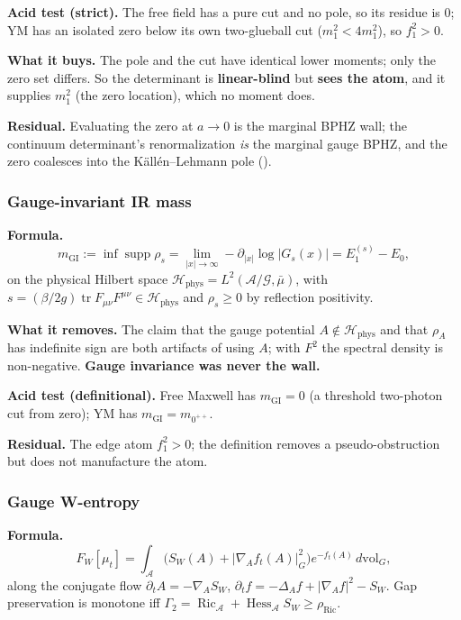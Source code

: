 \textbf{Acid test (strict).} The free field has a pure cut and no pole, so its residue is $0$;
YM has an isolated zero below its own two-glueball cut ($m_1^2<4m_1^2$), so $f_1^2>0$.

\textbf{What it buys.} The pole and the cut have identical lower moments; only the zero set
differs. So the determinant is \textbf{linear-blind} but \textbf{sees the atom}, and it supplies
$m_1^2$ (the zero location), which no moment does.

\textbf{Residual.} Evaluating the zero at $a\to0$ is the marginal BPHZ wall; the continuum
determinant's renormalization \emph{is} the marginal gauge BPHZ, and the zero coalesces into the
K\"all\'en--Lehmann pole ().

\subsubsection{Gauge-invariant IR mass}

\textbf{Formula.}
\begin{equation}
m_{\mathrm{GI}}:=\inf\operatorname{supp}\rho_s
=\lim_{|x|\to\infty}-\partial_{|x|}\log|G_s(x)|=E_1^{(s)}-E_0 ,
\label{eq:mgi}
\end{equation}
on the physical Hilbert space
$\mathcal{H}_{\mathrm{phys}}=L^2(\mathcal{A}/\mathcal{G},\bar\mu)$, with
$s=(\beta/2g)\operatorname{tr}F_{\mu\nu}F^{\mu\nu}\in \mathcal{H}_{\mathrm{phys}}$ and
$\rho_s\ge0$ by reflection positivity.

\textbf{What it removes.} The claim that the gauge potential $A\notin \mathcal{H}_{\mathrm{phys}}$
and that $\rho_A$ has indefinite sign are both artifacts of using $A$; with $F^2$ the spectral
density is non-negative. \textbf{Gauge invariance was never the wall.}

\textbf{Acid test (definitional).} Free Maxwell has $m_{\mathrm{GI}}=0$ (a threshold two-photon
cut from zero); YM has $m_{\mathrm{GI}}=m_{0^{++}}$.

\textbf{Residual.} The edge atom $f_1^2>0$; the definition removes a pseudo-obstruction but does
not manufacture the atom.

\subsubsection{Gauge W-entropy}

\textbf{Formula.}
\begin{equation}
F_W[\mu_t]=\int_{\mathcal{A}}\bigl(S_W(A)+|\nabla_Af_t(A)|_G^2\bigr)e^{-f_t(A)}\,d\mathrm{vol}_G ,
\label{eq:wentropy}
\end{equation}
along the conjugate flow $\partial_tA=-\nabla_AS_W$,
$\partial_tf=-\Delta_Af+|\nabla_Af|^2-S_W$. Gap preservation is monotone iff
$\Gamma_2=\operatorname{Ric}_{\mathcal{A}}+\operatorname{Hess}_{\mathcal{A}}S_W\ge\rho_{\mathrm{Ric}}$.

